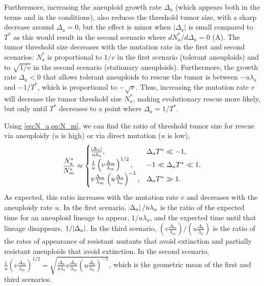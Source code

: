 \documentclass[12pt]{extarticle}
\begin{document}
Furthermore, increasing the aneuploid growth rate $\Delta_a$ (which appears both in the terms and in the conditions), also reduces the threshold tumor size, with a sharp decrease around $\Delta_a=0$, but the effect is minor when $|\Delta_a|$ is small compared to $T^*$ as this would result in the second scenario where  $dN_a^*/d\Delta_a=0$ (A). 
The tumor threshold size decreases with the mutation rate in the first and second scenarios: $N_a^*$ is proportional to $1/v$ in the first scenario (tolerant aneuploids) and to $\sqrt{1/v}$ in the second scenario (stationary aneuploids). Furthermore, the growth rate $\Delta_a<0$ that allows tolerant aneuploids to rescue the tumor is between $-u\lambda_a$ and  $-1/T^*$, which is proportional to $-\sqrt{v}$. Thus, increasing the mutation rate $v$ will decrease the tumor threshold size $N^*_a$, making evolutionary rescue more likely, but only until $T^*$ decreases to a point where  $\Delta_a =1/T^*$. %

Using \cref{eq:N_a,eq:N_m}, we can find the ratio of threshold tumor size for rescue via aneuploidy ($u$ is high) or via direct mutation ($u$ is low),
\begin{equation} \label{eq:N_ratio}
\frac{N^*_a}{N^*_m} \approx \begin{cases}
    \frac{\abs{\Delta_a}}{u\lambda_a} ,&
  \Delta_a T^* \ll -1 ,\\ 
  \frac{1}{u}\left(v  \frac{\Delta_m}{\lambda_m}\right)^{1/2} ,&
  -1 \ll \Delta_a T^* \ll 1  ,\\ 
  v \frac{\Delta_m}{\lambda_m}  \left(u\frac{\Delta_a}{\lambda_a}\right)^{-1}  ,&
   \Delta_a T^* \gg 1 .
  \end{cases}
\end{equation}
As expected, this ratio increases with the mutation rate $v$ and decreases with the aneuploidy rate $u$.
In the first scenario, $\abs{\Delta_a}/u\lambda_a$ is the ratio of the expected time for an aneuploid lineage to appear, $1/u\lambda_a$, and the expected time until that lineage disappears, $1/\abs{\Delta_a}$.
In the third scenario, $\left(v \frac{\Delta_m}{\lambda_m}\right) / \left(u \frac{\Delta_a}{\lambda_a}\right)$ is the ratio of the rates of appearance of resistant mutants that avoid extinction and partially resistant aneuploids that avoid extinction.
In the second scenario, $\frac{1}{u}\left(v  \frac{\Delta_m}{\lambda_m}\right)^{1/2}=\sqrt{\frac{\Delta_a}{u\lambda_a}  v \frac{\Delta_m}{\lambda_m}  \left(u\frac{\Delta_a}{\lambda_a}\right)^{-1}}$, which is the geometric mean of the first and third scenarios.
\end{document}
